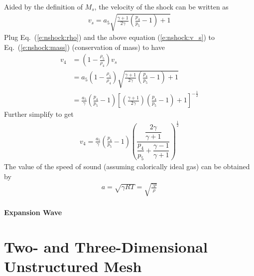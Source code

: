 \documentclass{turgon}
\begin{document}
Aided by the definition of $M_s$, the velocity of the shock can be written as
%
\begin{gather}
  v_s = a_5
  \sqrt{\frac{\gamma + 1}{2\gamma}\left(\frac{p_4}{p_5} - 1\right) + 1}
  \label{e:nshock:v_s}
\end{gather}
%
Plug Eq.~(\ref{e:nshock:rho}) and the above equation (\ref{e:nshock:v_s}) to
Eq.~(\ref{e:nshock:mass}) (conservation of mass) to have
%
\begin{align*}
  v_4 &= \left(1 - \frac{\rho_5}{\rho_4}\right) v_s
  \\
  &= a_5 \left(1 - \frac{\rho_5}{\rho_4}\right)
  \sqrt{\frac{\gamma + 1}{2\gamma}\left(\frac{p_4}{p_5} - 1\right) + 1}
  \\
  &=
  \frac{a_5}{\gamma} \left(\frac{p_4}{p_5} - 1\right)
  \left[
    \left(\frac{\gamma+1}{2\gamma}\right) \left(\frac{p_4}{p_5} - 1\right) + 1
    \right]^{-\frac{1}{2}}
\end{align*}
%
Further simplify to get
%
\begin{align}
  v_4 = \frac{a_5}{\gamma} \left(\frac{p_4}{p_5} - 1\right)
  \left(
  \dfrac{\dfrac{2\gamma}{\gamma+1}}
  {\dfrac{p_4}{p_5} + \dfrac{\gamma-1}{\gamma+1}}
  \right)^{\frac{1}{2}}
  \label{e:nshock:v_4}
\end{align}
%
The value of the speed of sound (assuming calorically ideal gas) can be
obtained by
%
\begin{align*}
  a = \sqrt{\gamma R T} = \sqrt{\frac{\gamma p}{\rho}}
\end{align*}

\subsubsection{Expansion Wave}

\chapter{Two- and Three-Dimensional Unstructured Mesh}
\label{c:ustm}

\clearpage
{}


\end{document}
